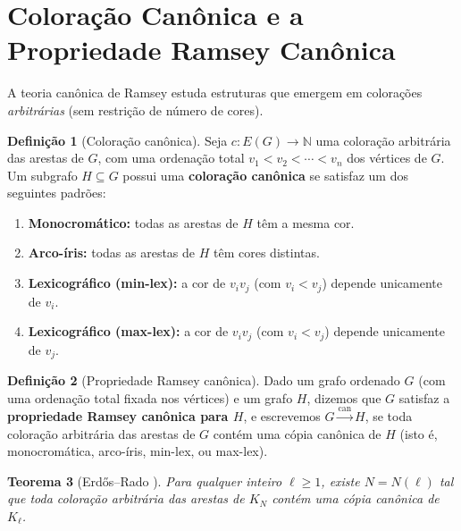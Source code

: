 \documentclass[reqno, 12pt]{amsart}
\numberwithin{equation}{section}
\theoremstyle{plain}
\newtheorem{theorem}{Teorema}[section]
\theoremstyle{definition}
\newtheorem{definition}[theorem]{Definição}
\begin{document}
\section{Coloração Canônica e a Propriedade Ramsey Canônica}
\label{sec:canonico}

A teoria canônica de Ramsey estuda estruturas que emergem em colorações
\emph{arbitrárias} (sem restrição de número de cores).

\begin{definition}[Coloração canônica]
  \label{def:canonica}
  Seja $c : E(G) \to \mathbb{N}$ uma coloração arbitrária das arestas de $G$,
  com uma ordenação total $v_1 < v_2 < \cdots < v_n$ dos vértices de $G$.
  Um subgrafo $H \subseteq G$ possui uma \textbf{coloração canônica} se
  satisfaz um dos seguintes padrões:
  \begin{enumerate}
    \item \textbf{Monocromático:} todas as arestas de $H$ têm a mesma cor.
    \item \textbf{Arco-íris:} todas as arestas de $H$ têm cores distintas.
    \item \textbf{Lexicográfico (min-lex):} a cor de $v_iv_j$ (com $v_i < v_j$)
          depende unicamente de $v_i$.
    \item \textbf{Lexicográfico (max-lex):} a cor de $v_iv_j$ (com $v_i < v_j$)
          depende unicamente de $v_j$.
  \end{enumerate}
\end{definition}

\begin{definition}[Propriedade Ramsey canônica]
  \label{def:prop-canonica}
  Dado um grafo ordenado $G$ (com uma ordenação total fixada nos vértices) e um grafo $H$,
  dizemos que $G$ satisfaz a \textbf{propriedade Ramsey canônica para $H$},
  e escrevemos $G \xrightarrow{\mathrm{can}} H$, se toda coloração arbitrária das arestas de $G$
  contém uma cópia canônica de $H$ (isto é, monocromática, arco-íris, min-lex, ou max-lex).
\end{definition}

\begin{theorem}[Erdős--Rado \cite{erdos1950combinatorial}]
  Para qualquer inteiro $\ell \ge 1$, existe $N = N(\ell)$ tal que toda coloração
  arbitrária das arestas de $K_N$ contém uma cópia canônica de $K_\ell$.
\end{theorem}
\end{document}
